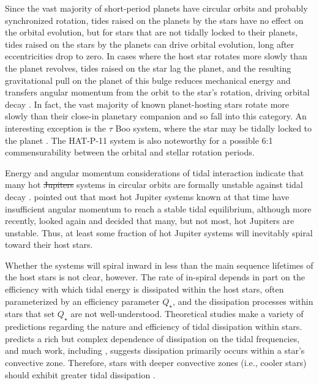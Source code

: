 \documentclass{svjour3}                     %
\providecommand{\DIFadd}[1]{{\protect\color{blue}\uwave{#1}}} %
\providecommand{\DIFdel}[1]{{\protect\color{red}\sout{#1}}}                      %
\providecommand{\DIFaddbegin}{} %
\providecommand{\DIFaddend}{} %
\providecommand{\DIFdelbegin}{} %
\providecommand{\DIFdelend}{} %
\begin{document}
Since the vast majority of short-period planets have circular orbits and probably synchronized rotation, tides raised on the planets by the stars have no effect on the orbital evolution, but for stars that are not tidally locked to their planets, tides raised on the stars by the planets can drive orbital evolution, long after eccentricities drop to zero. In cases where the host star rotates more slowly than the planet revolves, tides raised on the star lag the planet, and the resulting gravitational pull on the planet of this bulge reduces mechanical energy and transfers angular momentum from the orbit to the star's rotation, driving orbital decay \cite{2008CeMDA.101..171F}. In fact, the vast majority of known planet-hosting stars rotate more slowly than their close-in planetary companion and so fall into this category. An interesting exception is the $\tau$ Boo system, where the star may be tidally locked to the planet \cite{2008A&A...482..691W}. The HAT-P-11 system is also noteworthy for a possible 6:1 commensurability between the orbital and stellar rotation periods\DIFaddbegin \DIFadd{, as discussed in \mbox{%
\cite{2014ApJ...788....1B}}%
}\DIFaddend .

Energy and angular momentum considerations of tidal interaction indicate that many hot \DIFdelbegin \DIFdel{Jupiters }\DIFdelend \DIFaddbegin \DIFadd{Jupiter }\DIFaddend systems in circular orbits are formally unstable against tidal decay \cite{1973ApJ...180..307C}. \cite{2009ApJ...692L...9L} pointed out that most hot Jupiter systems known at that time have insufficient angular momentum to reach a stable tidal equilibrium, although more recently, \cite{2015MNRAS.446.3676A} looked again and decided that many, but not most, hot Jupiters are unstable. Thus, at least some fraction of hot Jupiter systems will inevitably spiral toward their host stars. 

Whether the systems will spiral inward in less than the main sequence lifetimes of the host stars is not clear, however. The rate of in-spiral depends in part on the efficiency with which tidal energy is dissipated within the host stars, often parameterized by an efficiency parameter $Q_\star$, and the dissipation processes within stars that set $Q_\star$ are not well-understood. Theoretical studies make a variety of predictions regarding the nature and efficiency of tidal dissipation within stars. \cite{2016ApJ...816...18E} predicts a rich but complex dependence of dissipation on the tidal frequencies, and much work, including \cite{2007ApJ...655.1166P}, suggests dissipation primarily occurs within a star's convective zone. Therefore, stars with deeper convective zones (i.e., cooler stars) should exhibit greater tidal dissipation \DIFaddbegin \DIFadd{efficiency}\DIFaddend . 
\end{document}

